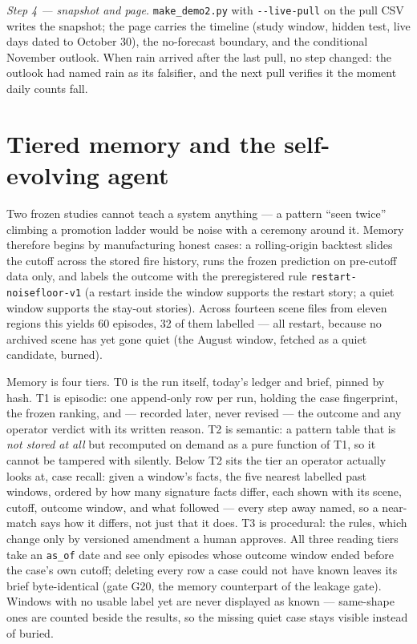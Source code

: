\documentclass[11pt]{article}
\begin{document}
\emph{Step 4 --- snapshot and page.}
\verb|make_demo2.py| with \verb|--live-pull| on the pull CSV
writes the snapshot; the page carries the timeline (study window, hidden
test, live days dated to October 30), the no-forecast boundary, and the
conditional November outlook. When rain arrived after the last pull, no step
changed: the outlook had named rain as its falsifier, and the next pull
verifies it the moment daily counts fall.

\section{Tiered memory and the self-evolving agent}
\label{sec:memory}

Two frozen studies cannot teach a system anything --- a pattern ``seen
twice'' climbing a promotion ladder would be noise with a ceremony around it.
Memory therefore begins by manufacturing honest cases: a rolling-origin
backtest slides the cutoff across the stored fire history, runs the frozen
prediction on pre-cutoff data only, and labels the outcome with the
preregistered rule \verb|restart-noisefloor-v1| (a restart inside the window
supports the restart story; a quiet window supports the stay-out stories).
Across fourteen scene files from eleven regions this yields 60 episodes, 32 of
them labelled --- all restart, because no archived scene has yet gone quiet
(the August window, fetched as a quiet candidate, burned).

Memory is four tiers. T0 is the run itself, today's ledger and brief, pinned
by hash. T1 is episodic: one append-only row per run, holding the case
fingerprint, the frozen ranking, and --- recorded later, never revised ---
the outcome and any operator verdict with its written reason. T2 is semantic:
a pattern table that is \emph{not stored at all} but recomputed on demand as
a pure function of T1, so it cannot be tampered with silently. Below T2 sits
the tier an operator actually looks at, case recall: given a window's facts,
the five nearest labelled past windows, ordered by how many signature facts
differ, each shown with its scene, cutoff, outcome window, and what
followed --- every step away named, so a near-match says how it differs,
not just that it does. T3 is
procedural: the rules, which change only by versioned amendment a human
approves. All three reading tiers take an \verb|as_of| date and see only
episodes whose outcome window ended before the case's own cutoff; deleting
every row a case could
not have known leaves its brief byte-identical (gate G20, the memory
counterpart of the leakage gate). Windows with no usable label yet are never
displayed as known --- same-shape ones are counted beside the results, so
the missing quiet case stays visible instead of buried.
\end{document}
